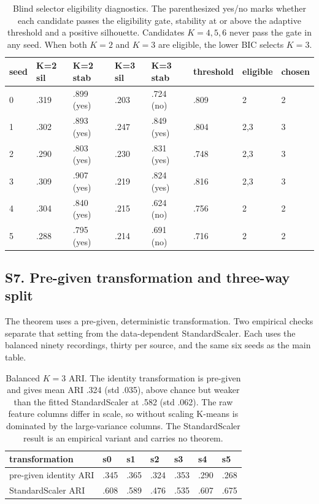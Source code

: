 \begin{table}[H]
\centering
\footnotesize
\caption{Blind selector eligibility diagnostics. The parenthesized yes/no marks whether each candidate passes the eligibility gate, stability at or above the adaptive threshold and a positive silhouette. Candidates $K=4,5,6$ never pass the gate in any seed. When both $K=2$ and $K=3$ are eligible, the lower BIC selects $K=3$.}
\label{tab:gatediag}
\begin{tabular}{llllllll}
\hline
seed & K=2 sil & K=2 stab & K=3 sil & K=3 stab & threshold & eligible & chosen\\
\hline
0 & .319 & .899 (yes) & .203 & .724 (no) & .809 & 2 & 2\\
1 & .302 & .893 (yes) & .247 & .849 (yes) & .804 & 2,3 & 3\\
2 & .290 & .803 (yes) & .230 & .831 (yes) & .748 & 2,3 & 3\\
3 & .309 & .907 (yes) & .219 & .824 (yes) & .816 & 2,3 & 3\\
4 & .304 & .840 (yes) & .215 & .624 (no) & .756 & 2 & 2\\
5 & .288 & .795 (yes) & .214 & .691 (no) & .716 & 2 & 2\\
\hline
\end{tabular}

\end{table}

\subsection{S7. Pre-given transformation and three-way
split}\label{s7.-pre-given-transformation-and-three-way-split}

The theorem uses a pre-given, deterministic transformation. Two
empirical checks separate that setting from the data-dependent
StandardScaler. Each uses the balanced ninety recordings, thirty per
source, and the same six seeds as the main table.

\begin{table}[H]
\centering
\footnotesize
\caption{Balanced $K=3$ ARI. The identity transformation is pre-given and gives mean ARI .324 (std .035), above chance but weaker than the fitted StandardScaler at .582 (std .062). The raw feature columns differ in scale, so without scaling K-means is dominated by the large-variance columns. The StandardScaler result is an empirical variant and carries no theorem.}
\label{tab:prefixed}
\begin{tabular}{lllllll}
\hline
transformation & s0 & s1 & s2 & s3 & s4 & s5\\
\hline
pre-given identity ARI & .345 & .365 & .324 & .353 & .290 & .268\\
StandardScaler ARI & .608 & .589 & .476 & .535 & .607 & .675\\
\hline
\end{tabular}

\end{table}

